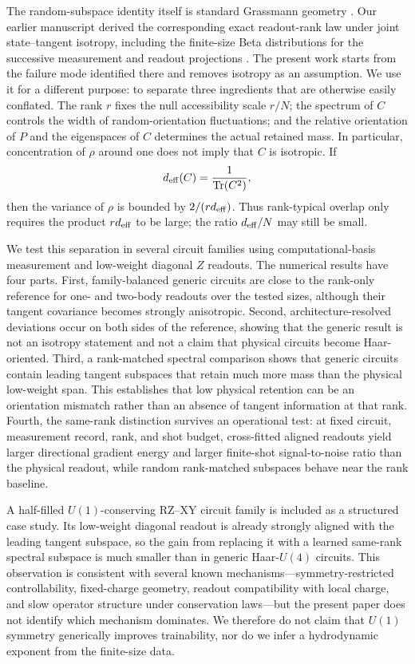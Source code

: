 \documentclass[aps,pra,reprint,superscriptaddress,nofootinbib,longbibliography]{revtex4-2}
\newcommand{\Tr}{\operatorname{Tr}}
\newcommand{\deff}{d_{\rm eff}}
\begin{document}
The random-subspace identity itself is standard Grassmann geometry \cite{CollinsMatsumoto2017,Bendokat2024,Fernandez2025}. Our earlier manuscript derived the corresponding exact readout-rank law under joint state--tangent isotropy, including the finite-size Beta distributions for the successive measurement and readout projections \cite{AitHaddou2026IsotropicRankLaws}. The present work starts from the failure mode identified there and removes isotropy as an assumption. We use it for a different purpose: to separate three ingredients that are otherwise easily conflated. The rank $r$ fixes the null accessibility scale $r/N$; the spectrum of $C$ controls the width of random-orientation fluctuations; and the relative orientation of $P$ and the eigenspaces of $C$ determines the actual retained mass. In particular, concentration of $\rho$ around one does not imply that $C$ is isotropic. If
\begin{equation}
\deff(C)=\frac{1}{\Tr(C^2)},
\label{eq:deff-intro}
\end{equation}
then the variance of $\rho$ is bounded by $2/(r\deff)$. Thus rank-typical overlap only requires the product $r\deff$ to be large; the ratio $\deff/N$ may still be small.

We test this separation in several circuit families using computational-basis measurement and low-weight diagonal $Z$ readouts. The numerical results have four parts. First, family-balanced generic circuits are close to the rank-only reference for one- and two-body readouts over the tested sizes, although their tangent covariance becomes strongly anisotropic. Second, architecture-resolved deviations occur on both sides of the reference, showing that the generic result is not an isotropy statement and not a claim that physical circuits become Haar-oriented. Third, a rank-matched spectral comparison shows that generic circuits contain leading tangent subspaces that retain much more mass than the physical low-weight span. This establishes that low physical retention can be an orientation mismatch rather than an absence of tangent information at that rank. Fourth, the same-rank distinction survives an operational test: at fixed circuit, measurement record, rank, and shot budget, cross-fitted aligned readouts yield larger directional gradient energy and larger finite-shot signal-to-noise ratio than the physical readout, while random rank-matched subspaces behave near the rank baseline.

A half-filled $U(1)$-conserving RZ--XY circuit family is included as a structured case study. Its low-weight diagonal readout is already strongly aligned with the leading tangent subspace, so the gain from replacing it with a learned same-rank spectral subspace is much smaller than in generic Haar-$U(4)$ circuits. This observation is consistent with several known mechanisms---symmetry-restricted controllability, fixed-charge geometry, readout compatibility with local charge, and slow operator structure under conservation laws---but the present paper does not identify which mechanism dominates. We therefore do not claim that $U(1)$ symmetry generically improves trainability, nor do we infer a hydrodynamic exponent from the finite-size data.
\end{document}
